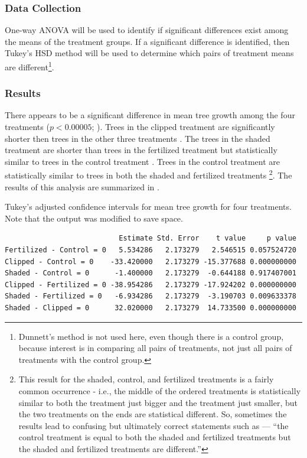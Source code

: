 \documentclass[10pt,openany]{book}\usepackage[]{graphicx}\usepackage[]{color}
\makeatletter
\newenvironment{kframe}{%
 \def\at@end@of@kframe{}%
 \ifinner\ifhmode%
  \def\at@end@of@kframe{\end{minipage}}%
  \begin{minipage}{\columnwidth}%
 \fi\fi%
 \def\FrameCommand##1{\hskip\@totalleftmargin \hskip-\fboxsep
 \colorbox{shadecolor}{##1}\hskip-\fboxsep
     \hskip-\linewidth \hskip-\@totalleftmargin \hskip\columnwidth}%
 \MakeFramed {\advance\hsize-\width
   \@totalleftmargin\z@ \linewidth\hsize
   \@setminipage}}%
 {\par\unskip\endMakeFramed%
 \at@end@of@kframe}
\newenvironment{knitrout}{}{} %
\makeatother
\begin{document}
\subsubsection*{Data Collection}
One-way ANOVA will be used to identify if significant differences exist among the means of the treatment groups.  If a significant difference is identified, then Tukey's HSD method will be used to determine which pairs of treatment means are different\footnote{Dunnett's method is not used here, even though there is a control group, because interest is in comparing all pairs of treatments, not just all pairs of treatments with the control group.}.

\subsubsection*{Results}
There appears to be a significant difference in mean tree growth among the four treatments ($p<0.00005$; ).  Trees in the clipped treatment are significantly shorter then trees in the other three treatments .  The trees in the shaded treatment are shorter than trees in the fertilized treatment but statistically similar to trees in the control treatment .  Trees in the control treatment are statistically similar to trees in both the shaded and fertilized treatments \footnote{This result for the shaded, control, and fertilized treatments is a fairly common occurrence - i.e., the middle of the ordered treatments is statistically similar to both the treatment just bigger and the treatment just smaller, but the two treatments on the ends are statistical different.  So, sometimes the results lead to confusing but ultimately correct statements such as --- ``the control treatment is equal to both the shaded and fertilized treatments but the shaded and fertilized treatments are different.''}.  The results of this analysis are summarized in .

\begin{table}[h]
  \centering
  \caption{Tukey's adjusted confidence intervals for mean tree growth for four treatments. Note that the output was modified to save space.}\label{tab:OWAEx2HSD}
\begin{knitrout}
\color{fgcolor}\begin{kframe}
\begin{verbatim}
                           Estimate Std. Error    t value     p value
Fertilized - Control = 0   5.534286   2.173279   2.546515 0.057524720
Clipped - Control = 0    -33.420000   2.173279 -15.377688 0.000000000
Shaded - Control = 0      -1.400000   2.173279  -0.644188 0.917407001
Clipped - Fertilized = 0 -38.954286   2.173279 -17.924202 0.000000000
Shaded - Fertilized = 0   -6.934286   2.173279  -3.190703 0.009633378
Shaded - Clipped = 0      32.020000   2.173279  14.733500 0.000000000
\end{verbatim}
\end{kframe}
\end{knitrout}
\end{table}
\end{document}

